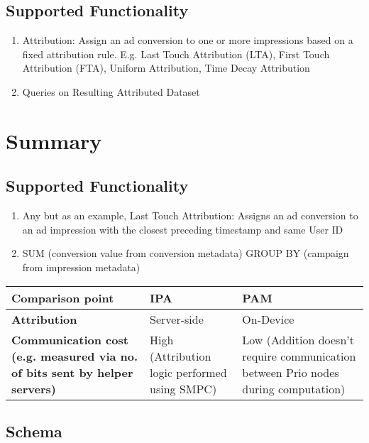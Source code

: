 \subsection{Supported Functionality}
\begin{enumerate}
    \item Attribution: Assign an ad conversion to one or more impressions based on a fixed attribution rule. E.g. Last Touch Attribution (LTA), First Touch Attribution (FTA), Uniform Attribution, Time Decay Attribution
    \item Queries on Resulting Attributed Dataset 
\end{enumerate}

\section{Summary}


\subsection{Supported Functionality}
\begin{enumerate}
    \item Any but as an example, Last Touch Attribution: Assigns an ad conversion to an ad impression with the closest preceding timestamp and same User ID 
    \item SUM (conversion value from conversion metadata) GROUP BY (campaign from impression metadata)
\end{enumerate}

\begin{table}
        \centering
        \begin{tabularx}{\textwidth}{ |X|X|X| }
                \hline
                \textbf{Comparison point} & \textbf{IPA} & \textbf{PAM} \\ \hline
                \textbf{Attribution} & Server-side  & On-Device \\ \hline
                \textbf{Communication cost (e.g. measured via no. of bits sent by helper servers)} & High (Attribution logic performed using SMPC) & Low (Addition doesn't require communication between Prio nodes during computation)  \\ \hline
        \end{tabularx}
\end{table}

\subsection{Schema}

